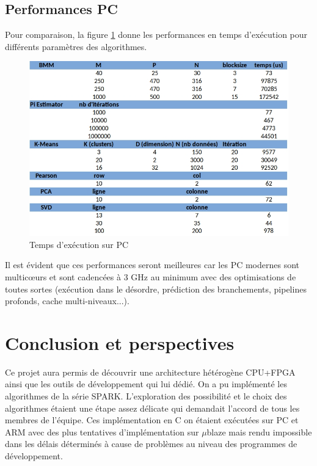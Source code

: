\documentclass[12pt,a4paper]{article}
\begin{document}
\subsection{Performances PC}
Pour comparaison, la figure \ref{fig:timepc} donne les performances en temps d'exécution pour différents paramètres des algorithmes.
\begin{figure}[H]
	\centering
	\includegraphics[width=0.8\linewidth]{soft/time_pc}
	\caption{Temps d'exécution sur PC}
	\label{fig:timepc}
\end{figure}
Il est évident que ces performances seront meilleures car les PC modernes sont multicœurs et sont cadencées à 3 GHz au minimum avec des optimisations de toutes sortes (exécution dans le désordre, prédiction des branchements, pipelines profonds, cache multi-niveaux...).

\section{Conclusion et perspectives}
Ce projet aura permis de découvrir une architecture hétérogène CPU+FPGA ainsi que les outils de développement qui lui dédié. On a pu implémenté les algorithmes de la série SPARK. L'exploration des possibilité et le choix des algorithmes étaient une étape assez délicate qui demandait l'accord de tous les membres de l'équipe. Ces implémentation en C on étaient exécutées sur PC et ARM avec des plus tentatives d'implémentation sur $\mu$blaze mais rendu impossible dans les délais déterminés à cause de problèmes au niveau des programmes de développement.
\end{document}
